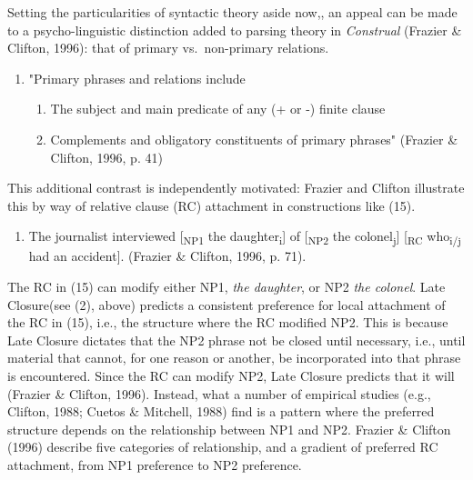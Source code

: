 \documentclass[11pt,oneside]{book}
\providecommand{\tightlist}{%
  \setlength{\itemsep}{0pt}\setlength{\parskip}{0pt}}
\begin{document}
Setting the particularities of syntactic theory aside now,, an appeal can be made to a psycho-linguistic distinction added to parsing theory in \emph{Construal} (Frazier \& Clifton, 1996): that of primary vs.~non-primary relations.

\begin{enumerate}
\def\labelenumi{(\arabic{enumi})}
\setcounter{enumi}{13}
\tightlist
\item
  "Primary phrases and relations include

  \begin{enumerate}
  \def\labelenumii{\alph{enumii})}
  \tightlist
  \item
    The subject and main predicate of any (+ or -) finite clause
  \item
    Complements and obligatory constituents of primary phrases"\linebreak\nopagebreak
    (Frazier \& Clifton, 1996, p. 41)
  \end{enumerate}
\end{enumerate}

This additional contrast is independently motivated: Frazier and Clifton illustrate this by way of relative clause (RC) attachment in constructions like (15).

\begin{enumerate}
\def\labelenumi{(\arabic{enumi})}
\setcounter{enumi}{14}
\tightlist
\item
  The journalist interviewed {[}\textsubscript{NP1} the daughter\textsubscript{i}{]} of {[}\textsubscript{NP2} the colonel\textsubscript{j}{]} {[}\textsubscript{RC} who\textsubscript{i/j} had an accident{]}. (Frazier \& Clifton, 1996, p. 71).
\end{enumerate}

The RC in (15) can modify either NP1, \emph{the daughter}, or NP2 \emph{the colonel}. Late Closure(see (2), above) predicts a consistent preference for local attachment of the RC in (15), i.e., the structure where the RC modified NP2. This is because Late Closure dictates that the NP2 phrase not be closed until necessary, i.e., until material that cannot, for one reason or another, be incorporated into that phrase is encountered. Since the RC can modify NP2, Late Closure predicts that it will (Frazier \& Clifton, 1996). Instead, what a number of empirical studies (e.g., Clifton, 1988; Cuetos \& Mitchell, 1988) find is a pattern where the preferred structure depends on the relationship between NP1 and NP2. Frazier \& Clifton (1996) describe five categories of relationship, and a gradient of preferred RC attachment, from NP1 preference to NP2 preference.
\end{document}
